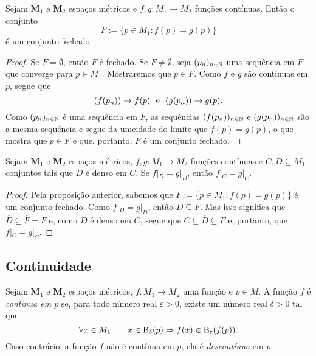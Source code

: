 \begin{prop}
	Sejam $\bm M_1$ e $\bm M_2$ espaços métricos e $f,g: M_1 \to M_2$ funções contínuas. Então o conjunto 
	\begin{equation*}
	F := \{p \in M_1 : f(p)=g(p)\}
	\end{equation*}
é um conjunto fechado.
\end{prop}
\begin{proof}
	Se $F=\emptyset$, então $F$ é fechado. Se $F \neq \emptyset$, seja $(p_n)_{n \in \mathbb{N}}$ uma sequência em $F$ que converge para $p \in M_1$. Mostraremos que $p \in F$. Como $f$ e $g$ são contínuas em $p$, segue que
	\begin{equation*}
	(f(p_n)) \rightarrow f(p) \text{\ \ e\ \ } (g(p_n)) \rightarrow g(p).
	\end{equation*}
	Como $(p_n)_{n \in \mathbb{N}}$ é uma sequência em $F$, as sequências $(f(p_n))_{n \in \mathbb{N}}$ e $(g(p_n))_{n \in \mathbb{N}}$ são a mesma sequência e segue da unicidade do limite que $f(p)=g(p)$, o que mostra que $p \in F$ e que, portanto, $F$ é um conjunto fechado.
\end{proof}

\begin{prop}
	Sejam $\bm M_1$ e $\bm M_2$ espaços métricos, $f,g: M_1 \to M_2$ funções contínuas e $C,D \subseteq M_1$ conjuntos tais que $D$ é denso em $C$. Se $f|_D = g|_D$, então $f|_C = g|_C$.
\end{prop}
\begin{proof}
	Pela proposição anterior, sabemos que $F := \{p \in M_1 : f(p)=g(p)\}$ é um conjunto fechado. Como $f|_D = g|_D$, então $D \subseteq F$. Mas isso significa que $\overline D \subseteq \overline F = F$ e, como $D$ é denso em $C$, segue que $C \subseteq \overline D \subseteq F$ e, portanto, que $f|_C = g|_C$. 
\end{proof}

\subsection{Continuidade}

\begin{defi}
Sejam $\bm M_1$ e $\bm M_2$ espaços métricos, $f: M_1 \to M_2$ uma função e $p \in M$. A função $f$ é \emph{contínua em $p$} se, para todo número real $\varepsilon > 0$, existe um número real $\delta > 0$ tal que
	\begin{equation*}
	\forall x \in M_1 \qquad x \in \mathrm{B}_\delta(p) \Rightarrow f(x) \in \mathrm{B}_\varepsilon(f(p)).
	\end{equation*}
Caso contrário, a função $f$ não é contínua em $p$, ela é \emph{descontínua} em $p$.
\end{defi}

